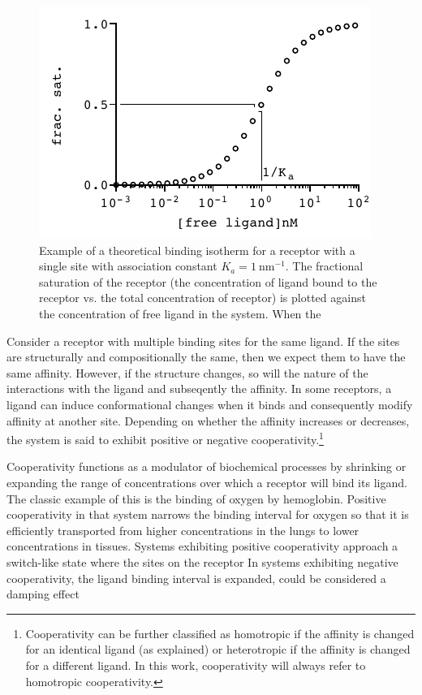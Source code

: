 \begin{figure}[h]
\centering
\includegraphics{./Figures/fsat_example.pdf}
\caption{Example of a theoretical binding isotherm for a receptor with a single site with association constant \(K_{a} = 1 \ \text{nm}^{-1}\). The fractional saturation of the receptor (the concentration of ligand bound to the receptor vs. the total concentration of receptor) is plotted against the concentration of free ligand in the system. When the }
\end{figure}
	


Consider a receptor with multiple binding sites for the same ligand. If the sites are structurally and compositionally the same, then we expect them to have the same affinity. However, if the structure changes, so will the nature of the interactions with the ligand and subseqently the affinity. In some receptors, a ligand can induce conformational changes when it binds and consequently modify affinity at another site. Depending on whether the affinity increases or decreases, the system is said to exhibit positive or negative cooperativity.\footnote{Cooperativity can be further classified as homotropic if the affinity is changed for an identical ligand (as explained) or heterotropic if the affinity is changed for a different ligand. In this work, cooperativity will always refer to homotropic cooperativity.} 

Cooperativity functions as a modulator of biochemical processes by shrinking or expanding the range of concentrations over which a receptor will bind its ligand. The classic example of this is the binding of oxygen by hemoglobin. Positive cooperativity in that system narrows the binding interval for oxygen so that it is efficiently transported from higher concentrations in the lungs to lower concentrations in tissues. Systems exhibiting positive cooperativity approach a switch-like state where the sites on the receptor   In systems exhibiting negative cooperativity, the ligand binding interval is expanded, could be considered a damping effect

